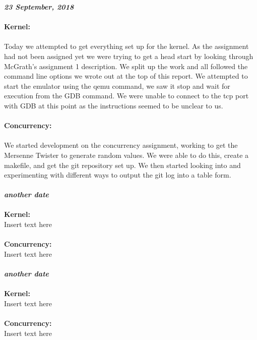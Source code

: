 \documentclass{article}
\begin{document}
\textit{\textbf{23 September, 2018}} \\\\
\textbf{Kernel:} \\\\
\indent Today we attempted to get everything set up for the kernel. As the assignment had not been assigned yet we were trying to get a head start by looking through McGrath's assignment 1 description. We split up the work and all followed the command line options we wrote out at the top of this report. We attempted to start the emulator using the qemu command, we saw it stop and wait for execution from the GDB command. We were unable to connect to the tcp port with GDB at this point as the instructions seemed to be unclear to us.
\\\\
\textbf{Concurrency:} \\\\
\indent We started development on the concurrency assignment, working to get the Mersenne Twister to generate random values. We were able to do this, create a makefile, and get the git repository set up. We then started looking into and experimenting with different ways to output the git log into a table form.
\\\\

\noindent
\textit{\textbf{another date}} \\\\
\textbf{Kernel:} \\
\indent Insert text here
\\\\
\textbf{Concurrency:} \\
\indent Insert text here
\\\\

\noindent
\textit{\textbf{another date}} \\\\
\textbf{Kernel:} \\
\indent Insert text here
\\\\
\textbf{Concurrency:} \\
\indent Insert text here
\\\\
\end{document}
